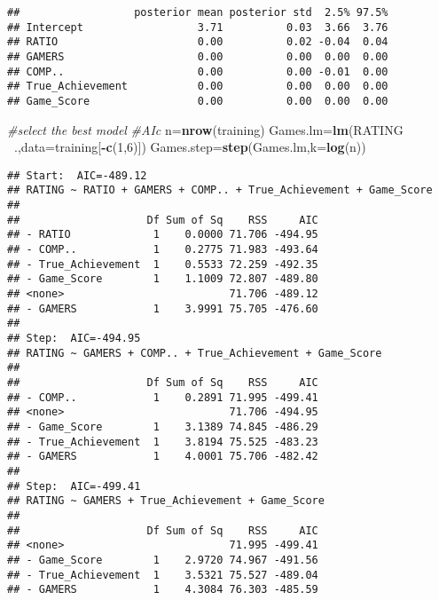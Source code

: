 \documentclass[
]{article}
\newenvironment{Shaded}{\begin{snugshade}}{\end{snugshade}}
\newcommand{\CommentTok}[1]{\textcolor[rgb]{0.56,0.35,0.01}{\textit{#1}}}
\newcommand{\DataTypeTok}[1]{\textcolor[rgb]{0.13,0.29,0.53}{#1}}
\newcommand{\DecValTok}[1]{\textcolor[rgb]{0.00,0.00,0.81}{#1}}
\newcommand{\KeywordTok}[1]{\textcolor[rgb]{0.13,0.29,0.53}{\textbf{#1}}}
\newcommand{\NormalTok}[1]{#1}
\newcommand{\OperatorTok}[1]{\textcolor[rgb]{0.81,0.36,0.00}{\textbf{#1}}}
\begin{document}
\begin{verbatim}
##                  posterior mean posterior std  2.5% 97.5%
## Intercept                  3.71          0.03  3.66  3.76
## RATIO                      0.00          0.02 -0.04  0.04
## GAMERS                     0.00          0.00  0.00  0.00
## COMP..                     0.00          0.00 -0.01  0.00
## True_Achievement           0.00          0.00  0.00  0.00
## Game_Score                 0.00          0.00  0.00  0.00
\end{verbatim}

\begin{Shaded}
\begin{Highlighting}[]
\CommentTok{#select the best model}
\CommentTok{#AIc}
\NormalTok{n=}\KeywordTok{nrow}\NormalTok{(training)}
\NormalTok{Games.lm=}\KeywordTok{lm}\NormalTok{(RATING }\OperatorTok{~}\NormalTok{.,}\DataTypeTok{data=}\NormalTok{training[}\OperatorTok{-}\KeywordTok{c}\NormalTok{(}\DecValTok{1}\NormalTok{,}\DecValTok{6}\NormalTok{)])}
\NormalTok{Games.step=}\KeywordTok{step}\NormalTok{(Games.lm,}\DataTypeTok{k=}\KeywordTok{log}\NormalTok{(n))}
\end{Highlighting}
\end{Shaded}

\begin{verbatim}
## Start:  AIC=-489.12
## RATING ~ RATIO + GAMERS + COMP.. + True_Achievement + Game_Score
## 
##                    Df Sum of Sq    RSS     AIC
## - RATIO             1    0.0000 71.706 -494.95
## - COMP..            1    0.2775 71.983 -493.64
## - True_Achievement  1    0.5533 72.259 -492.35
## - Game_Score        1    1.1009 72.807 -489.80
## <none>                          71.706 -489.12
## - GAMERS            1    3.9991 75.705 -476.60
## 
## Step:  AIC=-494.95
## RATING ~ GAMERS + COMP.. + True_Achievement + Game_Score
## 
##                    Df Sum of Sq    RSS     AIC
## - COMP..            1    0.2891 71.995 -499.41
## <none>                          71.706 -494.95
## - Game_Score        1    3.1389 74.845 -486.29
## - True_Achievement  1    3.8194 75.525 -483.23
## - GAMERS            1    4.0001 75.706 -482.42
## 
## Step:  AIC=-499.41
## RATING ~ GAMERS + True_Achievement + Game_Score
## 
##                    Df Sum of Sq    RSS     AIC
## <none>                          71.995 -499.41
## - Game_Score        1    2.9720 74.967 -491.56
## - True_Achievement  1    3.5321 75.527 -489.04
## - GAMERS            1    4.3084 76.303 -485.59
\end{verbatim}
\end{document}
